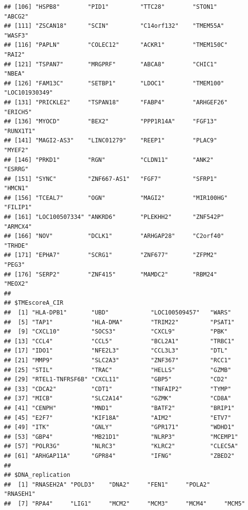 \documentclass[
  12pt,
]{book}
\theoremstyle{definition}
\theoremstyle{definition}
\theoremstyle{definition}
\theoremstyle{definition}
\theoremstyle{remark}
\begin{document}
\begin{verbatim}
## [106] "HSPB8"        "PID1"         "TTC28"        "STON1"        "ABCG2"       
## [111] "ZSCAN18"      "SCIN"         "C14orf132"    "TMEM55A"      "WASF3"       
## [116] "PAPLN"        "COLEC12"      "ACKR1"        "TMEM150C"     "RAI2"        
## [121] "TSPAN7"       "MRGPRF"       "ABCA8"        "CHIC1"        "NBEA"        
## [126] "FAM13C"       "SETBP1"       "LDOC1"        "TMEM100"      "LOC101930349"
## [131] "PRICKLE2"     "TSPAN18"      "FABP4"        "ARHGEF26"     "ERICH5"      
## [136] "MYOCD"        "BEX2"         "PPP1R14A"     "FGF13"        "RUNX1T1"     
## [141] "MAGI2-AS3"    "LINC01279"    "REEP1"        "PLAC9"        "MYEF2"       
## [146] "PRKD1"        "RGN"          "CLDN11"       "ANK2"         "ESRRG"       
## [151] "SYNC"         "ZNF667-AS1"   "FGF7"         "SFRP1"        "HMCN1"       
## [156] "TCEAL7"       "OGN"          "MAGI2"        "MIR100HG"     "FILIP1"      
## [161] "LOC100507334" "ANKRD6"       "PLEKHH2"      "ZNF542P"      "ARMCX4"      
## [166] "NOV"          "DCLK1"        "ARHGAP28"     "C2orf40"      "TRHDE"       
## [171] "EPHA7"        "SCRG1"        "ZNF677"       "ZFPM2"        "PEG3"        
## [176] "SERP2"        "ZNF415"       "MAMDC2"       "RBM24"        "MEOX2"       
## 
## $TMEscoreA_CIR
##  [1] "HLA-DPB1"       "UBD"            "LOC100509457"   "WARS"          
##  [5] "TAP1"           "HLA-DMA"        "TRIM22"         "PSAT1"         
##  [9] "CXCL10"         "SOCS3"          "CXCL9"          "PBK"           
## [13] "CCL4"           "CCL5"           "BCL2A1"         "TRBC1"         
## [17] "IDO1"           "NFE2L3"         "CCL3L3"         "DTL"           
## [21] "MMP9"           "SLC2A3"         "ZNF367"         "RCC1"          
## [25] "STIL"           "TRAC"           "HELLS"          "GZMB"          
## [29] "RTEL1-TNFRSF6B" "CXCL11"         "GBP5"           "CD2"           
## [33] "CDCA2"          "CDT1"           "TNFAIP2"        "TYMP"          
## [37] "MICB"           "SLC2A14"        "GZMK"           "CD8A"          
## [41] "CENPH"          "MND1"           "BATF2"          "BRIP1"         
## [45] "E2F7"           "KIF18A"         "AIM2"           "ETV7"          
## [49] "ITK"            "GNLY"           "GPR171"         "WDHD1"         
## [53] "GBP4"           "MB21D1"         "NLRP3"          "MCEMP1"        
## [57] "POLR3G"         "NLRC3"          "KLRC2"          "CLEC5A"        
## [61] "ARHGAP11A"      "GPR84"          "IFNG"           "ZBED2"         
## 
## $DNA_replication
##  [1] "RNASEH2A" "POLD3"    "DNA2"     "FEN1"     "POLA2"    "RNASEH1" 
##  [7] "RPA4"     "LIG1"     "MCM2"     "MCM3"     "MCM4"     "MCM5"    

\end{verbatim}
\end{document}
